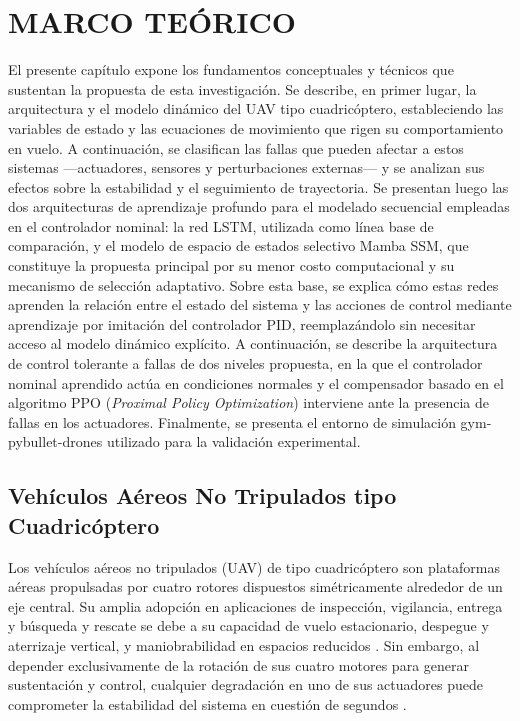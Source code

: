 \chapter{MARCO TEÓRICO}

El presente capítulo expone los fundamentos conceptuales y técnicos que sustentan la propuesta de esta investigación. Se describe, en primer lugar, la arquitectura y el modelo dinámico del UAV tipo cuadricóptero, estableciendo las variables de estado y las ecuaciones de movimiento que rigen su comportamiento en vuelo. A continuación, se clasifican las fallas que pueden afectar a estos sistemas —actuadores, sensores y perturbaciones externas— y se analizan sus efectos sobre la estabilidad y el seguimiento de trayectoria. Se presentan luego las dos arquitecturas de aprendizaje profundo para el modelado secuencial empleadas en el controlador nominal: la red LSTM, utilizada como línea base de comparación, y el modelo de espacio de estados selectivo Mamba SSM, que constituye la propuesta principal por su menor costo computacional y su mecanismo de selección adaptativo. Sobre esta base, se explica cómo estas redes aprenden la relación entre el estado del sistema y las acciones de control mediante aprendizaje por imitación del controlador PID, reemplazándolo sin necesitar acceso al modelo dinámico explícito. A continuación, se describe la arquitectura de control tolerante a fallas de dos niveles propuesta, en la que el controlador nominal aprendido actúa en condiciones normales y el compensador basado en el algoritmo PPO (\textit{Proximal Policy Optimization}) interviene ante la presencia de fallas en los actuadores. Finalmente, se presenta el entorno de simulación gym-pybullet-drones utilizado para la validación experimental.


\section{Vehículos Aéreos No Tripulados tipo Cuadricóptero}

Los vehículos aéreos no tripulados (UAV) de tipo cuadricóptero son plataformas aéreas propulsadas por cuatro rotores dispuestos simétricamente alrededor de un eje central. Su amplia adopción en aplicaciones de inspección, vigilancia, entrega y búsqueda y rescate se debe a su capacidad de vuelo estacionario, despegue y aterrizaje vertical, y maniobrabilidad en espacios reducidos \cite{fdd2021survey}. Sin embargo, al depender exclusivamente de la rotación de sus cuatro motores para generar sustentación y control, cualquier degradación en uno de sus actuadores puede comprometer la estabilidad del sistema en cuestión de segundos \cite{quadcopter2024, amoozgar2013}.

